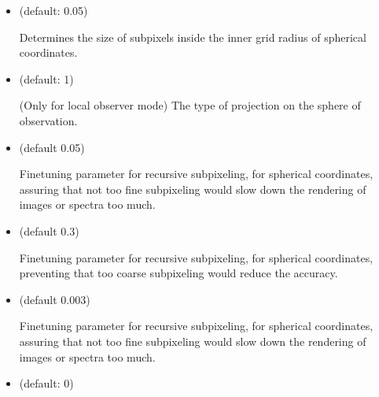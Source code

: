 \documentclass[letterpaper,10pt,english]{sphinxmanual}
\begin{document}
\begin{itemize}
For rectangular images and for the spectra/SEDs (but not for spectra/SEDs
created with circular pixel arrangements), this number tells RADMC\sphinxhyphen{}3D how
much it should do sub\sphinxhyphen{}pixeling over the stellar surface. That is: 20 means
that at least 20 sub\sphinxhyphen{}pixels are assured over the stellar surface. This is
important for flux conservation (see Section {\hyperref[\detokenize{imagesspectra:sec-image-refinement}]{}}).

\item {} 
 (default: 0.05) 

Determines the size of sub\sphinxhyphen{}pixels inside the inner grid radius of
spherical coordinates.

\item {} 
 (default: 1)

(Only for local observer mode) The type of projection on the sphere of
observation.

\item {} 
 (default 0.05) 

Fine\sphinxhyphen{}tuning parameter for recursive subpixeling, for spherical coordinates,
assuring that not too fine subpixeling would slow down the rendering of
images or spectra too much.

\item {} 
 (default 0.3) 

Fine\sphinxhyphen{}tuning parameter for recursive subpixeling, for spherical coordinates,
preventing that too coarse subpixeling would reduce the accuracy.

\item {} 
 (default 0.003) 

Fine\sphinxhyphen{}tuning parameter for recursive subpixeling, for spherical coordinates,
assuring that not too fine subpixeling would slow down the rendering of
images or spectra too much.

\item {} 
 (default: 0)


\end{itemize}
\end{document}
